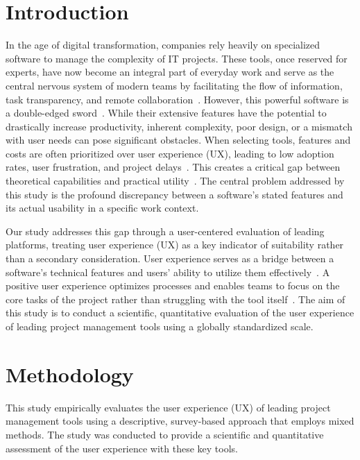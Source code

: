 \documentclass[runningheads]{llncs}
\begin{document}
\section{Introduction}
In the age of digital transformation, companies rely heavily on specialized software to manage the complexity of IT projects. These tools, once reserved for experts, have now become an integral part of everyday work and serve as the central nervous system of modern teams by facilitating the flow of information, task transparency, and remote collaboration~\cite{borsci2015assessing}. However, this powerful software is a double-edged sword~\cite{10.1145/3134660}. While their extensive features have the potential to drastically increase productivity, inherent complexity, poor design, or a mismatch with user needs can pose significant obstacles. When selecting tools, features and costs are often prioritized over user experience (UX), leading to low adoption rates, user frustration, and project delays~\cite{chilana2010understanding}. This creates a critical gap between theoretical capabilities and practical utility~\cite{alomar2016usability}. The central problem addressed by this study is the profound discrepancy between a software’s stated features and its actual usability in a specific work context.

Our study addresses this gap through a user-centered evaluation of leading platforms, treating user experience (UX) as a key indicator of suitability rather than a secondary consideration. User experience serves as a bridge between a software’s technical features and users’ ability to utilize them effectively~\cite{gomez2026integrating}. A positive user experience optimizes processes and enables teams to focus on the core tasks of the project rather than struggling with the tool itself~\cite{azhar2023ui}. The aim of this study is to conduct a scientific, quantitative evaluation of the user experience of leading project management tools using a globally standardized scale.


\section{Methodology}
This study empirically evaluates the user experience (UX) of leading project management tools using a descriptive, survey-based approach that employs mixed methods. The study was conducted to provide a scientific and quantitative assessment of the user experience with these key tools.
\end{document}
